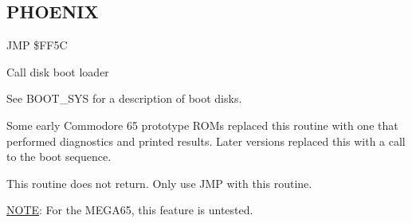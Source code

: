 
\newpage
\subsection{PHOENIX}
\label{KERNAL Jump Table!PHOENIX}
\begin{description}[leftmargin=2cm,style=nextline]
    \item [Address:] JMP \$FF5C
    \item [Description:] Call disk boot loader
    \item [Remarks:]
        See BOOT\_SYS for a description of boot disks.

        Some early Commodore 65 prototype ROMs replaced this routine with one that performed diagnostics and printed results. Later versions replaced this with a call to the boot sequence.

        This routine does not return. Only use JMP with this routine.

        \underline{NOTE}: For the MEGA65, this feature is untested.

    \item [Example:]

\end{description}



\newpage
